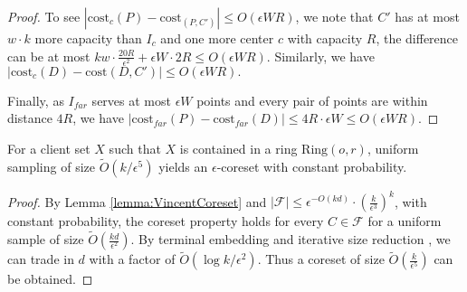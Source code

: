 {\begin{proof}
To see $|\mathrm{cost}_{c}(P)-\mathrm{cost}_(P,C')|\leq  O(\epsilon W R)$, we note that $C'$ has at most $w\cdot k$ more capacity than $I_c$ and one more center $c$ with capacity $R$, the difference can be at most $kw\cdot \frac{20R}{\epsilon^2}+\epsilon W\cdot 2R\leq O(\epsilon W R)$. Similarly, we have $ |\mathrm{cost}_{c}(D)-\mathrm{cost}(D,C')|\leq  O(\epsilon W R).
$ 

Finally, as $I_{far}$ serves at most $\epsilon W$ points and every pair of points are within distance $4R$, we have $|\mathrm{cost}_{far}(P)-\mathrm{cost}_{far}(D)|\leq 4R\cdot \epsilon W\leq O(\epsilon W R)$.
\end{proof}
}

\begin{theorem}

For a client set $X$ such that $X$ is contained in a ring $\mathrm{Ring}(o,r)$, uniform sampling of size $\tilde{O}(k/\epsilon^5)$ yields an $\epsilon$-coreset with constant probability. 
\end{theorem}

\begin{proof}
By Lemma \ref{lemma:VincentCoreset} and $|\mathcal{F}|\leq \epsilon^{-O(kd)}\cdot (\frac{k}{\epsilon^3})^k$, with constant probability, the coreset property holds for every $C\in \mathcal{F}$ for a uniform sample of size $\tilde{O}(\frac{kd}{\epsilon^2})$. By terminal embedding \cite{narayanan2019optimal} and iterative size reduction \cite{braverman2021coresets}, we can trade in $d$ with a factor of $\tilde{O}(\log k/\epsilon^2)$. Thus a coreset of size $\tilde{O}(\frac{k}{\epsilon^5})$ can be obtained.
\end{proof}

